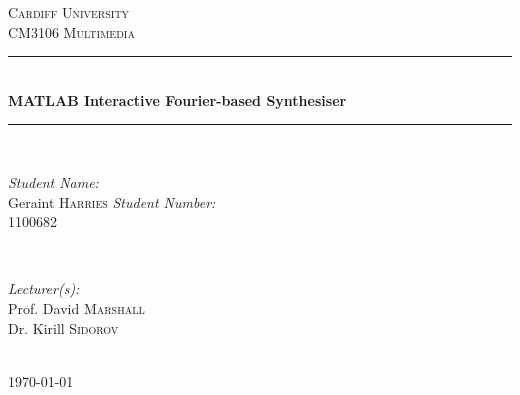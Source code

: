 \documentclass[12pt]{article}
\begin{document}
		\begin{titlepage}

			\newcommand{\HRule}{\rule{\linewidth}{0.5mm}}
			\center
 
			\textsc{\LARGE Cardiff University}\\[1.5cm] 
			\textsc{\Large CM3106 Multimedia}\\[0.5cm] 

			\HRule \\[0.4cm]
				{ \huge \bfseries MATLAB Interactive Fourier-based Synthesiser}\\[0.4cm] 
			\HRule \\[1.5cm]
 
			\begin{minipage}{0.4\textwidth}
				\begin{flushleft} \large
					\emph{Student Name:}\\
						Geraint \textsc{Harries} \newline
					\emph{Student Number:}\\
						1100682
				\end{flushleft}
			\end{minipage}
			~
			\begin{minipage}{0.4\textwidth}
				\begin{flushright} \large
					\emph{Lecturer(s):} \\
						Prof. David \textsc{Marshall} \\
						Dr. Kirill \textsc{Sidorov}
				\end{flushright}
			\end{minipage}\\[4cm]

			{\large \today}\\[3cm] 

			\vfill 

		\end{titlepage}
\end{document}
